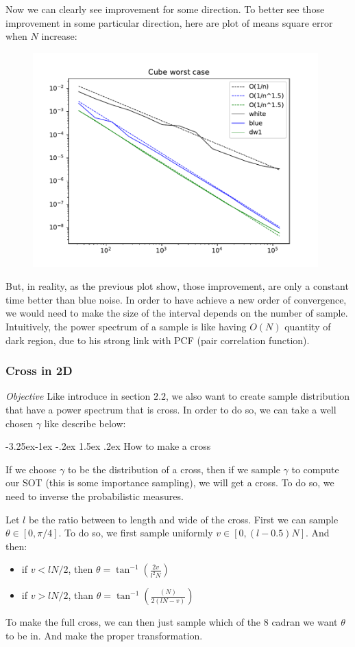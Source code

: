 \documentclass{classeENS}
\makeatletter
\newcounter{subsubsubsection}[subsubsection]
\newcommand\subsubsubsection{\@startsection{subsubsubsection}{4}{\z@}%
                                     {-3.25ex\@plus -1ex \@minus -.2ex}%
                                     {1.5ex \@plus .2ex}%
                                     {\normalfont\normalsize\bfseries}}
\makeatother
\begin{document}
Now we can clearly see improvement for some direction. To better see those improvement in
some particular direction, here are plot of means square error when $N$ increase:

    \begin{figure}[H]
        \centering
        \includegraphics[width=110mm]{plot/integration_rec_dw.pdf}\\
    \end{figure}  

\>  But, in reality, as the previous plot show, those improvement, are 
    only a constant time better than 
    blue noise. In order to have achieve a new order of convergence, we would need to
    make the size of the interval depends on the number of sample. Intuitively, the power 
    spectrum of a sample is like having $O(N)$ quantity of dark region, due to his strong 
    link with PCF (pair correlation function).

\subsubsection{Cross in 2D}

\textit{Objective} Like introduce in section $2.2$, we also want to create sample
    distribution that have a power spectrum that is cross. In order to do so, we 
    can take a well chosen $\gamma$ like describe below:

\subsubsubsection{How to make a cross}

If we choose $\gamma$ to be the distribution of a cross, then if we sample $\gamma$ to 
compute our SOT (this is some importance sampling), we will get a cross. To do so, we need 
to inverse the probabilistic measures.

Let $l$ be the ratio between to length and wide of the cross.
First we can sample $\theta \in [0,\pi/4]$. To do so, we first sample uniformly $v \in [0,(l-0.5)N]$.
And then:  
\begin{itemize}
    \item if $v < lN/2$, then  $\theta = \tan^{-1}\left (\frac{2v}{l^2N} \right )$
    \item if $v > lN/2$, than $\theta = \tan^{-1}\left (\frac{(N)}{2(lN-v)} \right )$
\end{itemize}
To make the full cross, we can then just sample which of the 8 cadran we want $\theta$ to be in.
And make the proper transformation.
\end{document}
